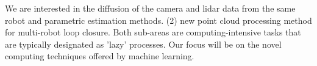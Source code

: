 We are interested in the diffusion of the camera and lidar data from the same robot and parametric estimation methods. (2) new point cloud processing method for multi-robot loop closure. Both sub-areas are computing-intensive tasks that are typically designated as 'lazy' processes. Our focus will be on the novel computing techniques offered by machine learning. 
